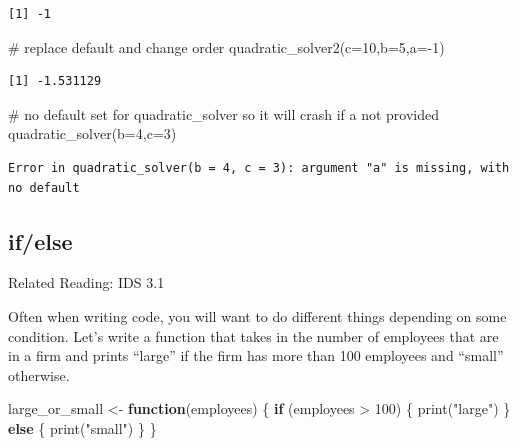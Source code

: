 \documentclass[
  letterpaper,
  DIV=11,
  numbers=noendperiod]{scrreprt}
\newenvironment{Shaded}{\begin{snugshade}}{\end{snugshade}}
\newcommand{\AttributeTok}[1]{\textcolor[rgb]{0.40,0.45,0.13}{#1}}
\newcommand{\CommentTok}[1]{\textcolor[rgb]{0.37,0.37,0.37}{#1}}
\newcommand{\ControlFlowTok}[1]{\textcolor[rgb]{0.00,0.23,0.31}{\textbf{#1}}}
\newcommand{\DecValTok}[1]{\textcolor[rgb]{0.68,0.00,0.00}{#1}}
\newcommand{\FunctionTok}[1]{\textcolor[rgb]{0.28,0.35,0.67}{#1}}
\newcommand{\NormalTok}[1]{\textcolor[rgb]{0.00,0.23,0.31}{#1}}
\newcommand{\OtherTok}[1]{\textcolor[rgb]{0.00,0.23,0.31}{#1}}
\newcommand{\SpecialCharTok}[1]{\textcolor[rgb]{0.37,0.37,0.37}{#1}}
\newcommand{\StringTok}[1]{\textcolor[rgb]{0.13,0.47,0.30}{#1}}
\begin{document}
\begin{verbatim}
[1] -1
\end{verbatim}

\begin{Shaded}
\begin{Highlighting}[]
\CommentTok{\# replace default and change order}
\FunctionTok{quadratic\_solver2}\NormalTok{(}\AttributeTok{c=}\DecValTok{10}\NormalTok{,}\AttributeTok{b=}\DecValTok{5}\NormalTok{,}\AttributeTok{a=}\SpecialCharTok{{-}}\DecValTok{1}\NormalTok{)}
\end{Highlighting}
\end{Shaded}

\begin{verbatim}
[1] -1.531129
\end{verbatim}

\begin{Shaded}
\begin{Highlighting}[]
\CommentTok{\# no default set for quadratic\_solver so it will crash if a not provided}
\FunctionTok{quadratic\_solver}\NormalTok{(}\AttributeTok{b=}\DecValTok{4}\NormalTok{,}\AttributeTok{c=}\DecValTok{3}\NormalTok{)}
\end{Highlighting}
\end{Shaded}

\begin{verbatim}
Error in quadratic_solver(b = 4, c = 3): argument "a" is missing, with no default
\end{verbatim}

\subsection{if/else}\label{ifelse}

Related Reading: IDS 3.1

Often when writing code, you will want to do different things depending
on some condition. Let's write a function that takes in the number of
employees that are in a firm and prints ``large'' if the firm has more
than 100 employees and ``small'' otherwise.

\begin{Shaded}
\begin{Highlighting}[]
\NormalTok{large\_or\_small }\OtherTok{\textless{}{-}} \ControlFlowTok{function}\NormalTok{(employees) \{}
  \ControlFlowTok{if}\NormalTok{ (employees }\SpecialCharTok{\textgreater{}} \DecValTok{100}\NormalTok{) \{}
    \FunctionTok{print}\NormalTok{(}\StringTok{"large"}\NormalTok{)}
\NormalTok{  \} }\ControlFlowTok{else}\NormalTok{ \{}
    \FunctionTok{print}\NormalTok{(}\StringTok{"small"}\NormalTok{)}
\NormalTok{  \}}
\NormalTok{\}}
\end{Highlighting}
\end{Shaded}
\end{document}
